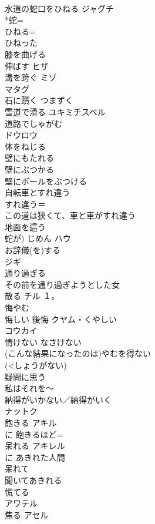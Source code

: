 \documentclass[8pt]{extreport}
\begin{document}
\begin{CJK}{UTF8}{min}
\\	水道の蛇口をひねる	ジャグチ 
\\	*蛇=
\\	ひねる=
\\	ひねった
\\	膝を曲げる 
\\	伸ばす	ヒザ 
\\	溝を跨ぐ	ミゾ 
\\	マタグ 
\\	石に躓く	つまずく 
\\	雪道で滑る	ユキミチスベル 
\\	道路でしゃがむ	
\\	ドウロウ
\\	体をねじる	
\\	壁にもたれる	
\\	壁にぶつかる	
\\	壁にボールをぶつける	
\\	自転車とすれ違う	
\\	すれ違う＝
\\	この道は狭くて、車と車がすれ違う
\\	地面を這う	
\\	蛇が) じめん ハウ
\\	お辞儀(を)する	
\\	ジギ
\\	通り過ぎる	
\\	その前を通り過ぎようとした女
\\	散る	チル １。
\\	悔やむ 
\\	悔しい 後悔	クヤム・くやしい 
\\	コウカイ 
\\	情けない	なさけない 
\\	(こんな結果になったのは)やむを得ない	
\\	(<しょうがない)
\\	疑問に思う	
\\	私はそれを〜 
\\	納得がいかない／納得がいく	
\\	ナットク
\\	飽きる	アキル 
\\	に 飽きるほど=
\\	呆れる	アキレル 
\\	に あきれた人間 
\\	呆れて 
\\	聞いてあきれる 
\\	慌てる	
\\	アワテル
\\	焦る	アセル 

\end{CJK}
\end{document}
